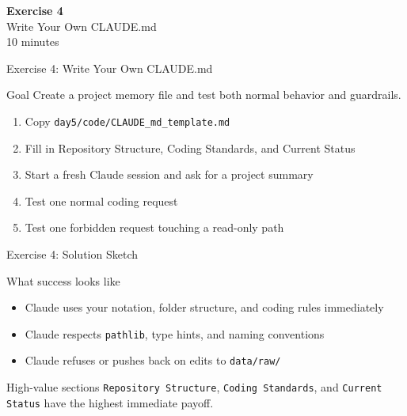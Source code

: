\documentclass[aspectratio=169,10pt]{beamer}
\begin{document}
\begin{frame}{}
\vfill\begin{center}{\Huge \textcolor{uzhblue}{\textbf{Exercise 4}}}\\[12pt]
{\LARGE Write Your Own CLAUDE.md}\\[6pt]{\small 10 minutes}\end{center}\vfill
\end{frame}

\begin{frame}[fragile]{Exercise 4: Write Your Own CLAUDE.md}
\begin{exampleblock}{Goal}
Create a project memory file and test both normal behavior and guardrails.
\end{exampleblock}
\small
\begin{enumerate}\itemsep2pt
    \item Copy \texttt{day5/code/CLAUDE\_md\_template.md}
    \item Fill in Repository Structure, Coding Standards, and Current Status
    \item Start a fresh Claude session and ask for a project summary
    \item Test one normal coding request
    \item Test one forbidden request touching a read-only path
\end{enumerate}
\end{frame}

\begin{frame}{Exercise 4: Solution Sketch}
\small
\begin{exampleblock}{What success looks like}
\begin{itemize}\itemsep2pt
    \item Claude uses your notation, folder structure, and coding rules immediately
    \item Claude respects \texttt{pathlib}, type hints, and naming conventions
    \item Claude refuses or pushes back on edits to \texttt{data/raw/}
\end{itemize}
\end{exampleblock}

\begin{alertblock}{High-value sections}
\texttt{Repository Structure}, \texttt{Coding Standards}, and
\texttt{Current Status} have the highest immediate payoff.
\end{alertblock}
\end{frame}
\end{document}
